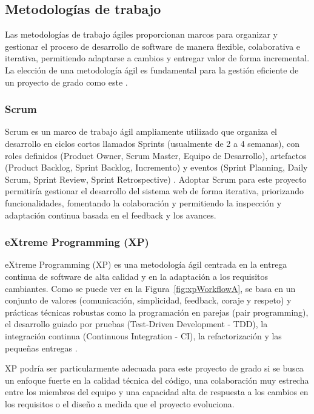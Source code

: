 \subsection{Metodologías de trabajo}
Las metodologías de trabajo ágiles proporcionan marcos para organizar y gestionar el proceso de desarrollo de software de manera flexible, colaborativa e iterativa, permitiendo adaptarse a cambios y entregar valor de forma incremental.
La elección de una metodología ágil es fundamental para la gestión eficiente de un proyecto de grado como este \parencite{Beck2001}.

\subsubsection{Scrum}
Scrum es un marco de trabajo ágil ampliamente utilizado que organiza el desarrollo en ciclos cortos llamados Sprints (usualmente de 2 a 4 semanas), con roles definidos (Product Owner, Scrum Master, Equipo de Desarrollo), artefactos (Product Backlog, Sprint Backlog, Incremento) y eventos (Sprint Planning, Daily Scrum, Sprint Review, Sprint Retrospective) \parencite{SchwaberSutherland2020}.
Adoptar Scrum para este proyecto permitiría gestionar el desarrollo del sistema web de forma iterativa, priorizando funcionalidades, fomentando la colaboración y permitiendo la inspección y adaptación continua basada en el feedback y los avances.

\subsubsection{eXtreme Programming (XP)}
eXtreme Programming (XP) es una metodología ágil centrada en la entrega continua de software de alta calidad y en la adaptación a los requisitos cambiantes.
Como se puede ver en la Figura~\ref{fig:xpWorkflowA}, se basa en un conjunto de valores (comunicación, simplicidad, feedback, coraje y respeto) y prácticas técnicas robustas como la programación en parejas (pair programming), el desarrollo guiado por pruebas (Test-Driven Development - TDD), la integración continua (Continuous Integration - CI), la refactorización y las pequeñas entregas \parencite{Beck2004}.

XP podría ser particularmente adecuada para este proyecto de grado si se busca un enfoque fuerte en la calidad técnica del código, una colaboración muy estrecha entre los miembros del equipo y una capacidad alta de respuesta a los cambios en los requisitos o el diseño a medida que el proyecto evoluciona.

